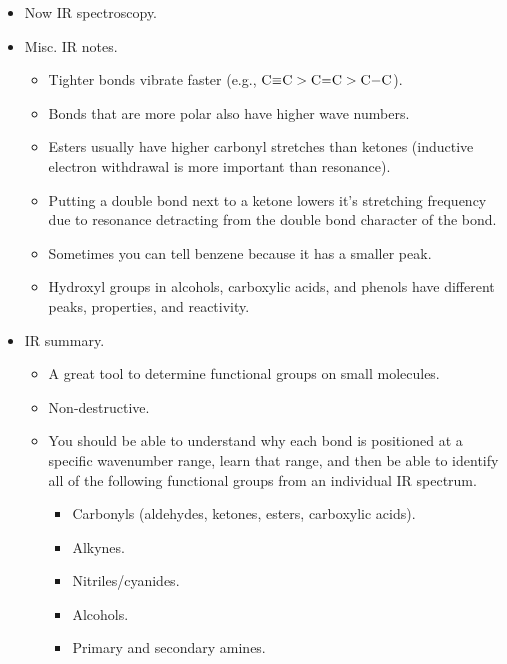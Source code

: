 \documentclass[../notes.tex]{subfiles}
\begin{document}
\begin{itemize}
    \item Now IR spectroscopy.
    \item Misc. IR notes.
    \begin{itemize}
        \item Tighter bonds vibrate faster (e.g., $\ce{C#C}>\ce{C=C}>\ce{C-C}$).
        \item Bonds that are more polar also have higher wave numbers.
        \item Esters usually have higher carbonyl stretches than ketones (inductive electron withdrawal is more important than resonance).
        \item Putting a double bond next to a ketone lowers it's stretching frequency due to resonance detracting from the double bond character of the  bond.
        \item Sometimes you can tell benzene because it has a smaller  peak.
        \item Hydroxyl groups in alcohols, carboxylic acids, and phenols have different peaks, properties, and reactivity.
    \end{itemize}
    \item IR summary.
    \begin{itemize}
        \item A great tool to determine functional groups on small molecules.
        \item Non-destructive.
        \item You should be able to understand why each bond is positioned at a specific wavenumber range, learn that range, and then be able to identify all of the following functional groups from an individual IR spectrum.
        \begin{itemize}
            \item Carbonyls (aldehydes, ketones, esters, carboxylic acids).
            \item Alkynes.
            \item Nitriles/cyanides.
            \item Alcohols.
            \item Primary and secondary amines.
        \end{itemize}
    \end{itemize}
\end{itemize}
\end{document}
